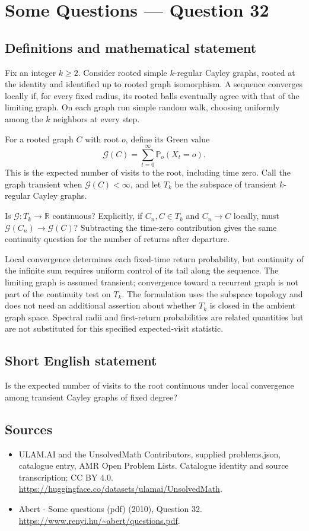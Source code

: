 \documentclass[11pt,a4paper]{article}
\begin{document}
\section*{Some Questions — Question 32}\label{statement}

\subsection{Definitions and mathematical statement}
Fix an integer $k\geq2$. Consider rooted simple $k$-regular Cayley graphs, rooted at the identity and identified up to rooted graph isomorphism. A sequence converges locally if, for every fixed radius, its rooted balls eventually agree with that of the limiting graph. On each graph run simple random walk, choosing uniformly among the $k$ neighbors at every step.

For a rooted graph $C$ with root $o$, define its Green value
\[
 \mathcal G(C)=\sum_{t=0}^{\infty}\mathbb P_o(X_t=o).
\]
This is the expected number of visits to the root, including time zero. Call the graph transient when $\mathcal G(C)<\infty$, and let $T_k$ be the subspace of transient $k$-regular Cayley graphs.

Is $\mathcal G:T_k\to\mathbb R$ continuous? Explicitly, if $C_n,C\in T_k$ and $C_n\to C$ locally, must $\mathcal G(C_n)\to\mathcal G(C)$? Subtracting the time-zero contribution gives the same continuity question for the number of returns after departure.

Local convergence determines each fixed-time return probability, but continuity of the infinite sum requires uniform control of its tail along the sequence. The limiting graph is assumed transient; convergence toward a recurrent graph is not part of the continuity test on $T_k$. The formulation uses the subspace topology and does not need an additional assertion about whether $T_k$ is closed in the ambient graph space. Spectral radii and first-return probabilities are related quantities but are not substituted for this specified expected-visit statistic.
\subsection{Short English statement}
Is the expected number of visits to the root continuous under local convergence among transient Cayley graphs of fixed degree?
\subsection{Sources}
\begin{itemize}
\item[S1] ULAM.AI and the UnsolvedMath Contributors, supplied problems.json, catalogue entry, AMR Open Problem Lists. Catalogue identity and source transcription; CC BY 4.0.
\url{https://huggingface.co/datasets/ulamai/UnsolvedMath}.
\item[S2] Abert - Some questions (pdf) (2010), Question 32. 
\url{https://www.renyi.hu/~abert/questions.pdf}.
\end{itemize}
\end{document}
